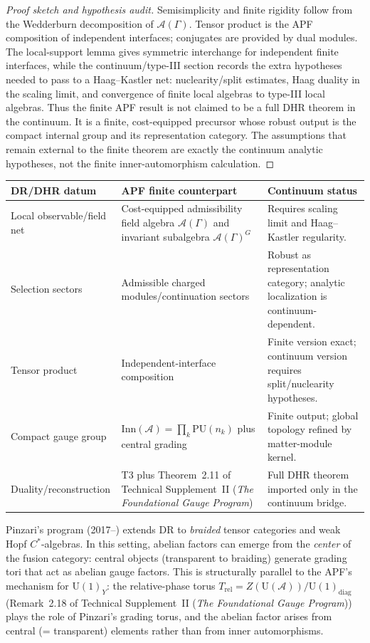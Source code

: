 \documentclass[11pt]{article}
\theoremstyle{definition}
\newcommand{\U}{\mathrm{U}}
\newcommand{\TSII}{Technical Supplement~II (\emph{The Foundational Gauge Program})}
\begin{document}
\begin{proof}[Proof sketch and hypothesis audit]
Semisimplicity and finite rigidity follow from the Wedderburn decomposition of
$\mathcal A(\Gamma)$.  Tensor product is the APF composition of independent
interfaces; conjugates are provided by dual modules.  The local-support lemma
gives symmetric interchange for independent finite interfaces, while the
continuum/type-III section records the extra hypotheses needed to pass to a
Haag--Kastler net: nuclearity/split estimates, Haag duality in the scaling
limit, and convergence of finite local algebras to type-III local algebras.
Thus the finite APF result is not claimed to be a full DHR theorem in the
continuum.  It is a finite, cost-equipped precursor whose robust output is the
compact internal group and its representation category.  The assumptions that
remain external to the finite theorem are exactly the continuum analytic
hypotheses, not the finite inner-automorphism calculation.
\end{proof}

\begin{center}\footnotesize
\renewcommand{\arraystretch}{1.12}
\begin{tabular}{@{}p{3.5cm}p{5.0cm}p{5.0cm}@{}}
\toprule
\textbf{DR/DHR datum} & \textbf{APF finite counterpart} & \textbf{Continuum status} \\
\midrule
Local observable/field net & Cost-equipped admissibility field algebra $\mathcal A(\Gamma)$ and invariant subalgebra $\mathcal A(\Gamma)^G$ & Requires scaling limit and Haag--Kastler regularity. \\
Selection sectors & Admissible charged modules/continuation sectors & Robust as representation category; analytic localization is continuum-dependent. \\
Tensor product & Independent-interface composition & Finite version exact; continuum version requires split/nuclearity hypotheses. \\
Compact gauge group & $\mathrm{Inn}(\mathcal A)=\prod_k \mathrm{PU}(n_k)$ plus central grading & Finite output; global topology refined by matter-module kernel. \\
Duality/reconstruction & T3 plus Theorem~2.11 of \TSII{} & Full DHR theorem imported only in the continuum bridge. \\
\bottomrule
\end{tabular}
\end{center}

Pinzari's program (2017--) extends DR to \emph{braided} tensor
categories and weak Hopf $C^*$-algebras.  In this setting, abelian
factors can emerge from the \emph{center} of the fusion category:
central objects (transparent to braiding) generate grading tori that
act as abelian gauge factors.  This is structurally parallel to the
APF's mechanism for $\U(1)_Y$: the relative-phase torus
$T_{\mathrm{rel}} = Z(\mathrm{U}(\mathcal{A})) /
\mathrm{U}(1)_{\mathrm{diag}}$ (Remark~2.18 of \TSII{}) plays the role
of Pinzari's grading torus, and the abelian factor arises from
central (= transparent) elements rather than from inner automorphisms.
\end{document}
